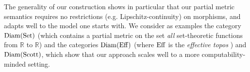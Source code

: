 The generality of our construction shows in particular that our partial metric semantics requires no restrictions (e.g. Lipschitz-continuity) on morphisms, and adapts well to the model one starts with. We consider as examples the category $\operatorname{Diam}(\operatorname{Set})$  (which contains a partial metric on the set \emph{all}  set-theoretic functions from $\mathbb R$ to $\mathbb R$) and the categories $\operatorname{Diam}(\operatorname{Eff})$ (where $\operatorname{Eff}$ is the \emph{effective topos} \cite{hyland:effective-topos}) and $\operatorname{Diam}(\operatorname{Scott})$, which show that our approach scales well to a more computability-minded setting.




%
%
%      
%
%

